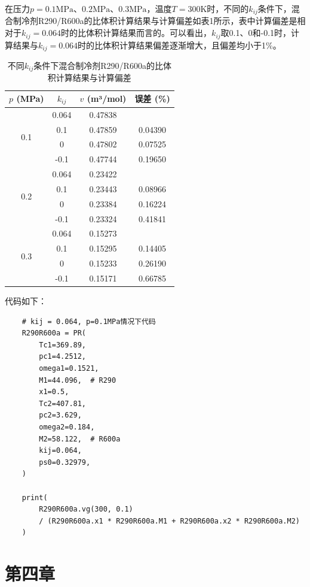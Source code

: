 \documentclass[12pt,a4paper]{article}
\begin{document}
在压力$p=0.1\mathrm{MPa}$、$0.2\mathrm{MPa}$、$0.3\mathrm{MPa}$，温度$T=300\mathrm{K}$时，不同的$k_{ij}$条件下，混合制冷剂R290/R600a的比体积计算结果与计算偏差如表1所示，表中计算偏差是相对于$k_{ij}=0.064$时的比体积计算结果而言的。可以看出，$k_{ij}$取0.1、0和-0.1时，计算结果与$k_{ij}=0.064$时的比体积计算结果偏差逐渐增大，且偏差均小于1\%。
\begin{table}[h]
\centering
\caption{不同$k_{ij}$条件下混合制冷剂R290/R600a的比体积计算结果与计算偏差}
\begin{tabular}{c c c c}
\hline
$p$ (MPa) & $k_{ij}$ &  $v$ (m³/mol) &误差 (\%) \\
\hline
\multirow{4}{*}{0.1} & 0.064 & 0.47838 &   \\
 & 0.1 & 0.47859 & 0.04390\\
 & 0 & 0.47802 & 0.07525  \\
 & -0.1 & 0.47744 & 0.19650  \\
\hline
\multirow{4}{*}{0.2} & 0.064 & 0.23422 &   \\
 & 0.1 & 0.23443 & 0.08966  \\
 & 0 & 0.23384 & 0.16224  \\
 & -0.1 & 0.23324 & 0.41841  \\
\hline
\multirow{4}{*}{0.3} & 0.064 & 0.15273 &   \\
 & 0.1 & 0.15295 & 0.14405  \\
 & 0 & 0.15233 & 0.26190  \\
 & -0.1 & 0.15171 & 0.66785  \\
\hline
\end{tabular}
\end{table}

代码如下：

\begin{lstlisting}
    # kij = 0.064, p=0.1MPa情况下代码
    R290R600a = PR(
        Tc1=369.89,
        pc1=4.2512,
        omega1=0.1521,
        M1=44.096,  # R290
        x1=0.5,
        Tc2=407.81,
        pc2=3.629,
        omega2=0.184,
        M2=58.122,  # R600a
        kij=0.064,
        ps0=0.32979,
    )

    print(
        R290R600a.vg(300, 0.1)
        / (R290R600a.x1 * R290R600a.M1 + R290R600a.x2 * R290R600a.M2)
    )
\end{lstlisting}

\newpage

\section*{第四章}
\end{document}
